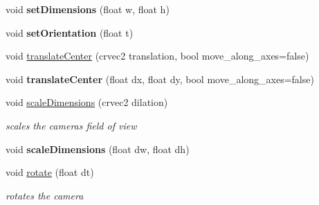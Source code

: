 \begin{DoxyCompactItemize}
\item 
\mbox{\label{classnta_1_1Camera2D_a253821b9dc464678c80ff92c31a8689f}} 
void {\bfseries set\+Dimensions} (float w, float h)
\item 
\mbox{\label{classnta_1_1Camera2D_ae1b3a5ef4259881936317fc0c18c4a13}} 
void {\bfseries set\+Orientation} (float t)
\item 
void \hyperlink{classnta_1_1Camera2D_a711b1b64b4e0bbca5c598ac15609f498}{translate\+Center} (crvec2 translation, bool move\+\_\+along\+\_\+axes=false)
\item 
\mbox{\label{classnta_1_1Camera2D_a95ecd50d9ec6031b4d015f33d442d096}} 
void {\bfseries translate\+Center} (float dx, float dy, bool move\+\_\+along\+\_\+axes=false)
\item 
\mbox{\label{classnta_1_1Camera2D_aa89b58a2a5ca0c3df56d07e2722afcd6}} 
void \hyperlink{classnta_1_1Camera2D_aa89b58a2a5ca0c3df56d07e2722afcd6}{scale\+Dimensions} (crvec2 dilation)
\begin{DoxyCompactList}\small\item\em scales the camera\textquotesingle{}s field of view \end{DoxyCompactList}\item 
\mbox{\label{classnta_1_1Camera2D_ae5e80a376fe4b6457e712c6bc94b8584}} 
void {\bfseries scale\+Dimensions} (float dw, float dh)
\item 
\mbox{\label{classnta_1_1Camera2D_a4529f2111c2621764c42365df5a504e0}} 
void \hyperlink{classnta_1_1Camera2D_a4529f2111c2621764c42365df5a504e0}{rotate} (float dt)
\begin{DoxyCompactList}\small\item\em rotates the camera \end{DoxyCompactList}\end{DoxyCompactItemize}
